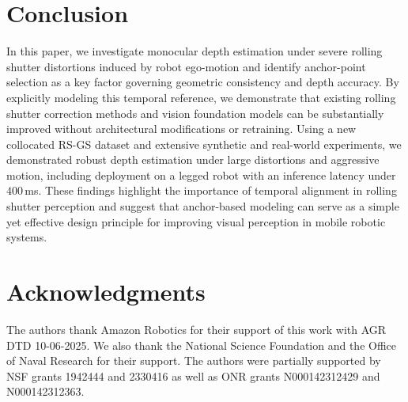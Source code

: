 \section{Conclusion}
In this paper, we investigate monocular depth estimation under severe rolling shutter distortions induced by robot ego-motion and identify anchor-point selection as a key factor governing geometric consistency and depth accuracy. By explicitly modeling this temporal reference, we demonstrate that existing rolling shutter correction methods and vision foundation models can be substantially improved without architectural modifications or retraining. Using a new collocated RS-GS dataset and extensive synthetic and real-world experiments, we demonstrated robust depth estimation under large distortions and aggressive motion, including deployment on a legged robot with an inference latency under $400$\,ms. These findings highlight the importance of temporal alignment in rolling shutter perception and suggest that anchor-based modeling can serve as a simple yet effective design principle for improving visual perception in mobile robotic systems.

\section*{Acknowledgments}
The authors thank Amazon Robotics for their support of this work with AGR DTD 10-06-2025. We also thank the National Science Foundation and the Office of Naval Research for their support. The authors were partially supported by NSF grants 1942444 and 2330416 as well as ONR grants N000142312429 and N000142312363.
